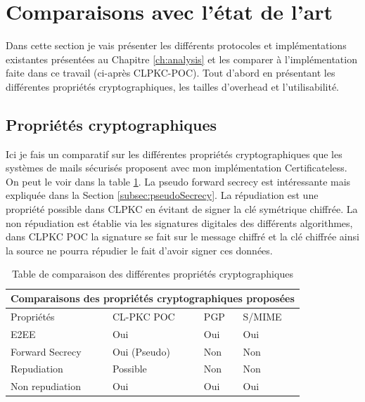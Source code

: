 \section{Comparaisons avec l'état de l'art}
Dans cette section je vais présenter les différents protocoles et implémentations existantes présentées au Chapitre \ref{ch:analysis} et les comparer à l'implémentation faite dans ce travail (ci-après CLPKC-POC). Tout d'abord en présentant les différentes propriétés cryptographiques, les tailles d'overhead et l'utilisabilité.

\subsection{Propriétés cryptographiques}
Ici je fais un comparatif sur les différentes propriétés cryptographiques que les systèmes de mails sécurisés proposent avec mon implémentation Certificateless. On peut le voir dans la table \ref{table:comparisonProperties}. La pseudo forward secrecy est intéressante mais expliquée dans la Section \ref{subsec:pseudoSecrecy}. La répudiation est une propriété possible dans CLPKC en évitant de signer la clé symétrique chiffrée. La non répudiation est établie via les signatures digitales des différents algorithmes, dans CLPKC POC la signature se fait sur le message chiffré et la clé chiffrée ainsi la source ne pourra répudier le fait d'avoir signer ces données. 
\begin{table}[h!]
	\centering
	\begin{tabular}{ |p{3cm}||p{3cm}|p{3cm}|p{3cm}| }
		\hline
		\multicolumn{4}{|c|}{Comparaisons des propriétés cryptographiques proposées} \\
		\hline
		Propriétés & CL-PKC POC & PGP & S/MIME \\
		\hline
		E2EE   & Oui & Oui & Oui\\
		Forward Secrecy & Oui (Pseudo) & Non & Non\\
		Repudiation & Possible & Non & Non\\
		Non repudiation & Oui & Oui & Oui\\
		\hline
	\end{tabular}
	\caption{Table de comparaison des différentes propriétés cryptographiques }
	\label{table:comparisonProperties}
\end{table}
